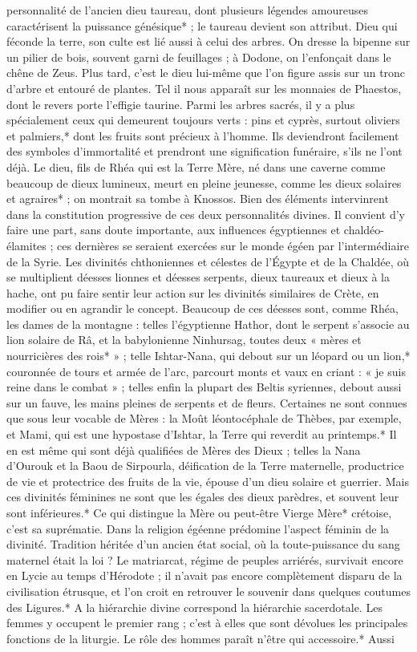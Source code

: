 \documentclass[a4paper, 11pt, oneside, polutonikogreek, french]{article}
\begin{document}
personnalité de l'ancien dieu taureau, dont plusieurs légendes amoureuses caractérisent la puissance génésique* ; le taureau devient son attribut. Dieu qui féconde la terre, son culte est lié aussi à celui des arbres. On dresse la bipenne sur un pilier de bois, souvent garni de feuillages ; à Dodone, on l'enfonçait dans le chêne de Zeus. Plus tard, c'est le dieu lui-même que l'on figure assis sur un tronc d'arbre et entouré de plantes. Tel il nous apparaît sur les monnaies de Phaestos, dont le revers porte l'effigie taurine. Parmi les arbres sacrés, il y a plus spécialement ceux qui demeurent toujours verts : pins et cyprès, surtout oliviers et palmiers,* dont les fruits sont précieux à l'homme. Ils deviendront facilement des symboles d'immortalité et prendront une signification funéraire, s'ils ne l'ont déjà. Le dieu, fils de Rhéa qui est la Terre Mère, né dans une caverne comme beaucoup de dieux lumineux, meurt en pleine jeunesse, comme les dieux solaires et agraires* ; on montrait sa tombe à Knossos. Bien des éléments intervinrent dans la constitution progressive de ces deux personnalités divines. Il convient d'y faire une part, sans doute importante, aux influences égyptiennes et chaldéo-élamites ; ces dernières se seraient exercées sur le monde égéen par l'intermédiaire de la Syrie. Les divinités chthoniennes et célestes de l'Égypte et de la Chaldée, où se multiplient déesses lionnes et déesses serpents, dieux taureaux et dieux à la hache, ont pu faire sentir leur action sur les divinités similaires de Crète, en modifier ou en agrandir le concept. Beaucoup de ces déesses sont, comme Rhéa, les dames de la montagne : telles l'égyptienne Hathor, dont le serpent s'associe au lion solaire de Râ, et la babylonienne Ninhursag, toutes deux « mères et nourricières des rois* » ; telle Ishtar-Nana, qui debout sur un léopard ou un lion,* couronnée de tours et armée de l'arc, parcourt monts et vaux en criant : « je suis reine dans le combat » ; telles enfin la plupart des Beltis syriennes, debout aussi sur un fauve, les mains pleines de serpents et de fleurs. Certaines ne sont connues que sous leur vocable de Mères : la Moût léontocéphale de Thèbes, par exemple, et Mami, qui est une hypostase d'Ishtar, la Terre qui reverdit au printemps.* Il en est même qui sont déjà qualifiées de Mères des Dieux ; telles la Nana d'Ourouk et la Baou de Sirpourla, déification de la Terre maternelle, productrice de vie et protectrice des fruits de la vie, épouse d'un dieu solaire et guerrier. Mais ces divinités féminines ne sont que les égales des dieux parèdres, et souvent leur sont inférieures.* Ce qui distingue la Mère ou peut-être Vierge Mère* crétoise, c'est sa suprématie. Dans la religion égéenne prédomine l'aspect féminin de la divinité. Tradition héritée d'un ancien état social, où la toute-puissance du sang maternel était la loi ? Le matriarcat, régime de peuples arriérés, survivait encore en Lycie au temps d'Hérodote ; il n'avait pas encore complètement disparu de la civilisation étrusque, et l'on croit en retrouver le souvenir dans quelques coutumes des Ligures.* A la hiérarchie divine correspond la hiérarchie sacerdotale. Les femmes y occupent le premier rang ; c'est à elles que sont dévolues les principales fonctions de la liturgie. Le rôle des hommes paraît n'être qui accessoire.* Aussi 
\end{document}
